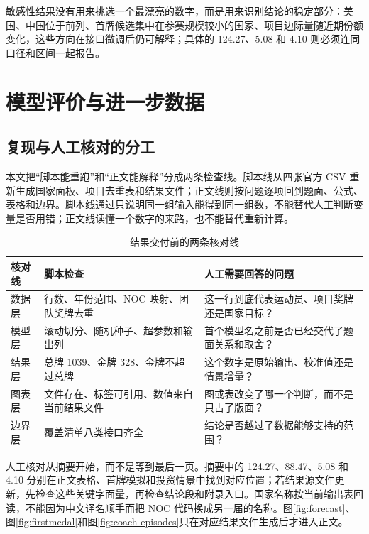 \documentclass[UTF8,11pt,a4paper]{ctexart}
\begin{document}
敏感性结果没有用来挑选一个最漂亮的数字，而是用来识别结论的稳定部分：美国、中国位于前列、首牌候选集中在参赛规模较小的国家、项目边际量随近期份额变化，这些方向在接口微调后仍可解释；具体的 124.27、5.08 和 4.10 则必须连同口径和区间一起报告。

\section{模型评价与进一步数据}

\subsection{复现与人工核对的分工}

本文把“脚本能重跑”和“正文能解释”分成两条检查线。脚本线从四张官方 CSV 重新生成国家面板、项目去重表和结果文件；正文线则按问题逐项回到题面、公式、表格和边界。脚本线通过只说明同一组输入能得到同一组数，不能替代人工判断变量是否用错；正文线读懂一个数字的来路，也不能替代重新计算。

\begin{table}[H]
\centering
\caption{结果交付前的两条核对线}
\label{tab:manual-recheck}
\small
\begin{tabularx}{\textwidth}{p{3.2cm}p{5.1cm}p{5.3cm}}
\toprule
核对线 & 脚本检查 & 人工需要回答的问题\\
\midrule
数据层 & 行数、年份范围、NOC 映射、团队奖牌去重 & 这一行到底代表运动员、项目奖牌还是国家目标？\\
模型层 & 滚动切分、随机种子、超参数和输出列 & 首个模型名之前是否已经交代了题面关系和取舍？\\
结果层 & 总牌 1039、金牌 328、金牌不超过总牌 & 这个数字是原始输出、校准值还是情景增量？\\
图表层 & 文件存在、标签可引用、数值来自当前结果文件 & 图或表改变了哪一个判断，而不是只占了版面？\\
边界层 & 覆盖清单八类接口齐全 & 结论是否越过了数据能够支持的范围？\\
\bottomrule
\end{tabularx}
\end{table}

人工核对从摘要开始，而不是等到最后一页。摘要中的 124.27、88.47、5.08 和 4.10 分别在正文表格、首牌模拟和投资情景中找到对应位置；若结果源文件更新，先检查这些关键字面量，再检查结论段和附录入口。国家名称按当前输出表回读，不能因为中文译名顺手而把 NOC 代码换成另一届的名称。图\ref{fig:forecast}、图\ref{fig:firstmedal}和图\ref{fig:coach-episodes}只在对应结果文件生成后才进入正文。
\end{document}
